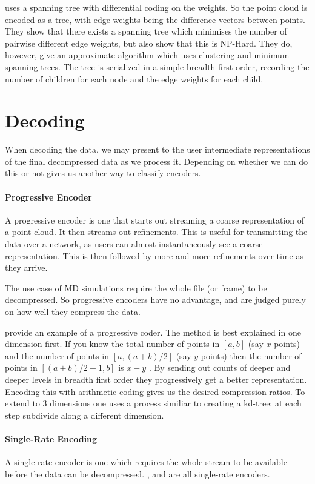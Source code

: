 \documentclass{report}
\begin{document}
\citep{chen2005lcp} uses a spanning tree with differential coding on the
weights. So the point cloud is encoded as a tree, with edge weights being the
difference vectors between points. They show that there exists a spanning tree
which minimises the number of pairwise different edge weights, but also show
that this is NP-Hard. They do, however, give an approximate algorithm which
uses clustering and minimum spanning trees. The tree is serialized in a simple
breadth-first order, recording the number of children for each node and the
edge weights for each child.


\section{Decoding}

When decoding the data, we may present to the user intermediate
representations of the final decompressed data as we process it. Depending on
whether we can do this or not gives us another way to classify encoders.

\paragraph{Progressive Encoder}
A progressive encoder is one that starts out streaming a coarse representation
of a point cloud. It then streams out refinements. This is useful for
transmitting the data over a network, as users can almost instantaneously see
a coarse representation. This is then followed by more and more refinements
over time as they arrive.

The use case of MD simulations require the whole file (or frame) to be
decompressed. So progressive encoders have no advantage, and are judged purely
on how well they compress the data.

\citep{devillers2000gci} provide an example of a progressive coder. The method
is best explained in one dimension first. If you know the total number of
points in $[a, b]$ (say $x$ points) and the number of points in $[a, (a+b)/2]$
(say $y$ points) then the number of points in $[(a+b)/2+1, b]$ is $x - y$ . By
sending out counts of deeper and deeper levels in breadth first order they
progressively get a better representation. Encoding this with arithmetic
coding gives us the desired compression ratios. To extend to 3 dimensions one
uses a process similiar to creating a kd-tree: at each step subdivide along a
different dimension.

\paragraph{Single-Rate Encoding}
A single-rate encoder is one which requires the whole stream to be available
before the data can be decompressed. \citep{omeltchenko2000sls},
\citep{gumholdcomp} and \citep{merrycomp} are all single-rate encoders.
\end{document}
